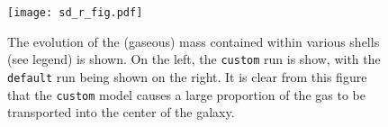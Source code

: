 \begin{figure}
    \centering
    \texttt{[image: sd\_r\_fig.pdf]}
    \caption{The evolution of the (gaseous) mass contained within various shells (see legend) is shown. On the left, the {\tt custom} run is show, with the {\tt default} run being shown on the right. It is clear from this figure that the {\tt custom} model causes a large proportion of the gas to be transported into the center of the galaxy.}
    \label{fig:sd_r_evo}
\end{figure}
